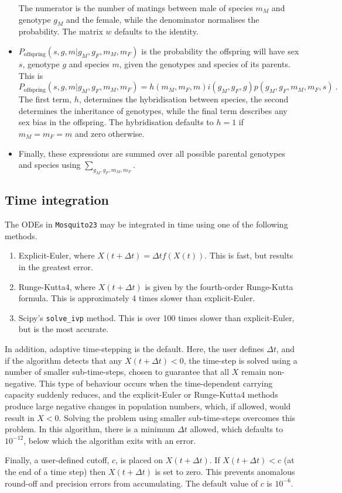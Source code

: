 \documentclass[11pt,a4paper]{article}
\begin{document}
\begin{itemize}
\begin{equation}
\end{equation}
The numerator is the number of matings between male of species $m_{M}$ and genotype $g_{M}$ and the female, while the denominator normalises the probability.  The matrix $w$ defaults to the identity.
\item $P_{\mathrm{offspring}}(s, g, m | g_{M}, g_{F}, m_{M}, m_{F})$ is the probability the offspring will have sex $s$, genotype $g$ and species $m$, given the genotypes and species of its parents.  This is
\begin{equation}
P_{\mathrm{offspring}}(s, g, m | g_{M}, g_{F}, m_{M}, m_{F}) = h(m_{M}, m_{F}, m)i(g_{M}, g_{F}, g)p(g_{M}, g_{F}, m_{M}, m_{F}, s) \ .
\end{equation}
The first term, $h$, determines the hybridisation between species, the second determines the inheritance of genotypes, while the final term describes any sex bias in the offspring.  The hybridisation defaults to $h=1$ if $m_{M}=m_{F}=m$ and zero otherwise.  
\item Finally, these expressions are summed over all possible parental genotypes and species using $\sum_{g_{M}, g_{F}, m_{M}, m_{F}}$.
\end{itemize}

\subsection{Time integration}

The ODEs in {\tt Mosquito23} may be integrated in time using one of the following methods.
\begin{enumerate}
\item Explicit-Euler, where $X(t + \Delta t) = \Delta t f(X(t))$.  This is fast, but results in the greatest error.
\item Runge-Kutta4, where $X(t + \Delta t)$ is given by the fourth-order Runge-Kutta formula.  This is approximately 4 times slower than explicit-Euler.
\item Scipy's {\tt solve\_ivp} method.  This is over 100 times slower than explicit-Euler, but is the most accurate.
\end{enumerate}

In addition, adaptive time-stepping is the default.  Here, the user defines $\Delta t$, and if the algorithm detects that any $X(t + \Delta t) < 0$, the time-step is solved using a number of smaller sub-time-steps, chosen to guarantee that all $X$ remain non-negative.  This type of behaviour occurs when the time-dependent carrying capacity suddenly reduces, and the explicit-Euler or Runge-Kutta4 methods produce large negative changes in population numbers, which, if allowed, would result in $X<0$.  Solving the problem using smaller sub-time-steps overcomes this problem.  In this algorithm, there is a minimum $\Delta t$ allowed, which defaults to $10^{-12}$, below which the algorithm exits with an error.

Finally, a user-defined cutoff, $c$, is placed on $X(t + \Delta t)$.  If $X(t + \Delta t) < c$ (at the end of a time step) then $X(t + \Delta t)$ is set to zero.  This prevents anomalous round-off and precision errors from accumulating.  The default value of $c$ is $10^{-6}$.
\end{document}
